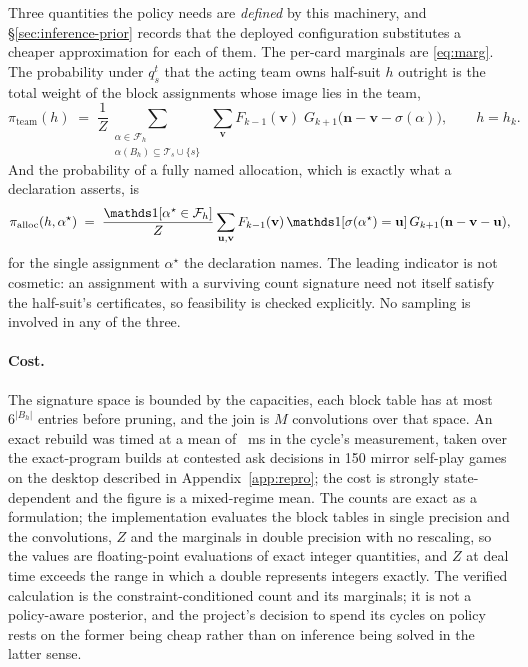 Three quantities the policy needs are \emph{defined} by this machinery, and
\S\ref{sec:inference-prior} records that the deployed configuration substitutes a cheaper
approximation for each of them. The per-card marginals are \eqref{eq:marg}. The probability under
$q_s^t$ that the acting team owns half-suit $h$ outright is the total weight of the block
assignments whose image lies in the team,
\begin{equation}
  \pi_{\mathrm{team}}(h) \;=\; \frac{1}{Z}
  \sum_{\substack{\alpha \in \mathcal{F}_h\\ \alpha(B_h) \subseteq \mathcal{T}_s \cup \{s\}}}
  \;\sum_{\mathbf{v}} F_{k-1}(\mathbf{v})\; G_{k+1}\bigl(\mathbf{n}-\mathbf{v}-\sigma(\alpha)\bigr),
  \qquad h = h_k.
  \label{eq:team}
\end{equation}
And the probability of a fully named allocation, which is exactly what a declaration asserts, is
\begin{equation}
  \pi_{\mathrm{alloc}}(h, \alpha^\star) \;=\;
  \frac{\ind\!\left[\alpha^\star \in \mathcal{F}_h\right]}{Z}
  \sum_{\mathbf{u}, \mathbf{v}} F_{k-1}(\mathbf{v})\,
  \ind\!\left[\sigma(\alpha^\star) = \mathbf{u}\right]
  G_{k+1}(\mathbf{n}-\mathbf{v}-\mathbf{u}),
  \label{eq:alloc}
\end{equation}
for the single assignment $\alpha^\star$ the declaration names. The leading indicator is not
cosmetic: an assignment with a surviving count signature need not itself satisfy the half-suit's
certificates, so feasibility is checked explicitly. No sampling is involved in any of the three.

\paragraph{Cost.} The signature space is bounded by the capacities, each block table has at most
$6^{|B_h|}$ entries before pruning, and the join is $M$ convolutions over that space. An exact
rebuild was timed at a mean of \vsixCountCost{}~ms in the \vsix{} cycle's measurement, taken over
the exact-program builds at contested ask decisions in 150 mirror self-play games on the desktop
described in Appendix~\ref{app:repro}; the cost is strongly state-dependent and the figure is a
mixed-regime mean. The counts are exact as a formulation; the implementation evaluates the block
tables in single precision and the convolutions, $Z$ and the marginals in double precision with no
rescaling, so the values are floating-point evaluations of exact integer quantities, and $Z$ at deal
time exceeds the range in which a double represents integers exactly. The verified calculation is the constraint-conditioned count and
its marginals; it is not a policy-aware posterior, and the project's decision to spend its cycles on
policy rests on the former being cheap rather than on inference being solved in the latter sense.

